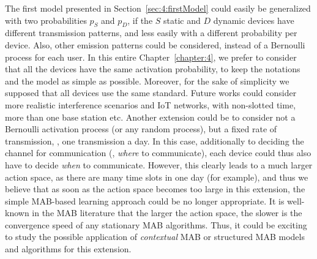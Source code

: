 



The first model presented in Section~\ref{sec:4:firstModel} could easily be generalized with two probabilities $p_S$ and $p_D$, if the $S$ static and $D$ dynamic devices have different transmission patterns, and less easily with a different probability per device.
Also, other emission patterns could be considered, instead of a Bernoulli process for each user.
In this entire Chapter~\ref{chapter:4}, we prefer to consider that all the devices have the same activation probability, to keep the notations and the model as simple as possible.
%
Moreover, for the sake of simplicity we supposed that all devices use the same standard.
Future works could consider more realistic interference scenarios and IoT networks, with non-slotted time, more than one base station etc.
Another extension could be to consider not a Bernoulli activation process (or any random process), but a fixed rate of transmission, \eg, one transmission a day.
In this case, additionally to deciding the channel for communication (\ie, \emph{where} to communicate), each device could thus also have to decide \emph{when} to communicate.
However, this clearly leads to a much larger action space, as there are many time slots in one day (for example), and thus we believe that as soon as the action space becomes too large in this extension, the simple MAB-based learning approach could be no longer appropriate.
It is well-known in the MAB literature that the larger the action space, the slower is the convergence speed of any stationary MAB algorithms.
Thus, it could be exciting to study the possible application of \emph{contextual} MAB \cite{Li10,Luo18} or structured MAB \cite{Combes17} models and algorithms for this extension.
%
